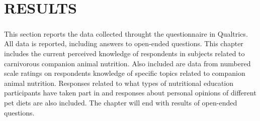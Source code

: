 \chapter{RESULTS}


This section reports the data collected throught the questionnaire in Qualtrics\textsuperscript{\textregistered}. All data is reported, including answers to open-ended questions. This chapter includes the current perceived knowledge of respondents in subjects related to carnivorous companion animal nutrition. Also included are data from numbered scale ratings on respondents knowledge of specific topics related to companion animal nutrition. Responses related to what types of nutritional education participants have taken part in and responses about personal opinions of different pet diets are also included. The chapter will end with results of open-ended questions.

